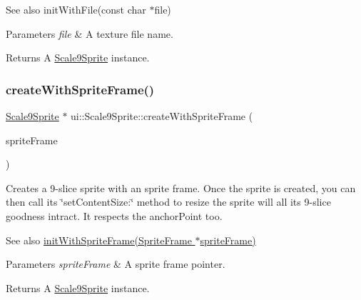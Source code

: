 \begin{DoxySeeAlso}{See also}
init\+With\+File(const char $\ast$file) 
\end{DoxySeeAlso}

\begin{DoxyParams}{Parameters}
{\em file} & A texture file name. \\
\hline
\end{DoxyParams}
\begin{DoxyReturn}{Returns}
A \hyperlink{classui_1_1Scale9Sprite}{Scale9\+Sprite} instance. 
\end{DoxyReturn}
\mbox{\label{classui_1_1Scale9Sprite_aa57483a53bca83bb2674262392d658c2}} 
\subsubsection{\texorpdfstring{create\+With\+Sprite\+Frame()}{createWithSpriteFrame()}\hspace{0.1cm}{\footnotesize\ttfamily [1/4]}}
{\footnotesize\ttfamily \hyperlink{classui_1_1Scale9Sprite}{Scale9\+Sprite} $\ast$ ui\+::\+Scale9\+Sprite\+::create\+With\+Sprite\+Frame (\begin{DoxyParamCaption}\item[{\hyperlink{classSpriteFrame}{Sprite\+Frame} $\ast$}]{sprite\+Frame }\end{DoxyParamCaption})\hspace{0.3cm}{\ttfamily [static]}}

Creates a 9-\/slice sprite with an sprite frame. Once the sprite is created, you can then call its \char`\"{}set\+Content\+Size\+:\char`\"{} method to resize the sprite will all it\textquotesingle{}s 9-\/slice goodness intract. It respects the anchor\+Point too.

\begin{DoxySeeAlso}{See also}
\hyperlink{classui_1_1Scale9Sprite_a77f0c229307f987be75ebad959cb2b18}{init\+With\+Sprite\+Frame(\+Sprite\+Frame $\ast$sprite\+Frame)} 
\end{DoxySeeAlso}

\begin{DoxyParams}{Parameters}
{\em sprite\+Frame} & A sprite frame pointer. \\
\hline
\end{DoxyParams}
\begin{DoxyReturn}{Returns}
A \hyperlink{classui_1_1Scale9Sprite}{Scale9\+Sprite} instance. 
\end{DoxyReturn}
\mbox{\label{classui_1_1Scale9Sprite_a93d524a427de3b8b0fa1d8f8bff8cccf}} 
